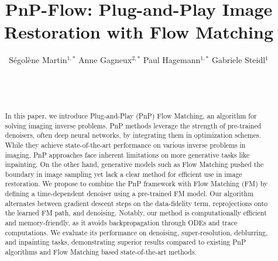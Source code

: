 \documentclass{article} %
\author{S\'egol\`ene Martin$^{1, *}$
\And
Anne Gagneux$^{2, *}$
\And
Paul Hagemann$^{1, *}$
\And Gabriele Steidl$^{1}$
\and  \normalfont{$^{1}$ Technische Universit\"at Berlin} \\
\normalfont{$^{2}$ ENS de Lyon, CNRS, Universit\'e Claude Bernard Lyon 1, Inria, LIP, UMR 5668} \\ \normalfont{* Equal contributions}
}
\title{PnP-Flow: Plug-and-Play Image Restoration with Flow Matching}
\theoremstyle{definition}
\begin{document}
\maketitle


\begin{abstract}
    In this paper, we introduce Plug-and-Play (PnP) Flow Matching, an algorithm for solving imaging inverse problems. 
   PnP methods leverage the strength of pre-trained denoisers, often deep neural networks, by integrating them in optimization schemes. 
    While they achieve state-of-the-art performance on various inverse problems in imaging, PnP approaches face inherent limitations on more generative tasks like inpainting. 
    On the other hand, 
    generative models such as Flow Matching pushed the boundary in image sampling yet lack a clear method for efficient use in image restoration.
    We propose to combine the PnP framework with Flow Matching (FM) by defining a time-dependent denoiser using a pre-trained FM model.
    Our algorithm alternates between gradient descent steps on the data-fidelity term, reprojections onto the learned FM path, and denoising. 
    Notably, our method is computationally efficient and memory-friendly, as it avoids backpropagation through ODEs and trace computations. 
    We evaluate its performance on denoising, super-resolution, deblurring, and inpainting tasks, demonstrating superior results compared to existing PnP algorithms and Flow Matching based state-of-the-art methods.
\end{abstract}
\end{document}
